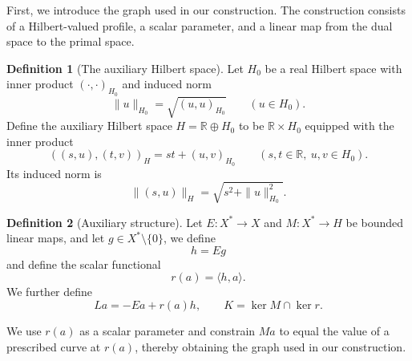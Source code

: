 \documentclass[11pt]{article}
\newcommand{\R}{\mathbb R}
\newcommand{\pair}[2]{\langle #1,#2\rangle}
\theoremstyle{definition}
\newtheorem{definition}{Definition}
\theoremstyle{remark}
\begin{document}
First, we introduce the graph used in our construction. The construction consists of a Hilbert-valued profile, a scalar parameter, and a linear map from the dual space to the primal space. 


\begin{definition}[The auxiliary Hilbert space]
\label{def:hilbert-spaces-norms}
Let $H_0$ be a real Hilbert space with inner product $(\cdot,\cdot)_{H_0}$ and induced norm
\[
\|u\|_{H_0}=\sqrt{(u,u)_{H_0}}\qquad(u\in H_0).
\]
Define the auxiliary Hilbert space $H=\R\oplus H_0$ to be $\R\times H_0$ equipped with the inner product
\[
((s,u),(t,v))_H=st+(u,v)_{H_0}
\qquad(s,t\in\R,\ u,v\in H_0).
\]
Its induced norm is
\[
\|(s,u)\|_H=\sqrt{s^2+\|u\|_{H_0}^2}.
\]
\end{definition}


\begin{definition}[Auxiliary structure]
\label{def:construction-maps}
Let $E:X^*\to X$ and $M:X^*\to H$ be bounded linear maps, and let
$g\in X^*\setminus\{0\}$, we define 
\[
h=Eg
\]
and define the scalar functional
\[
r(a)=\pair{h}{a}.
\]
We further define
\[
La=-Ea+r(a)h,
\qquad
K=\ker M\cap\ker r.
\]
\end{definition}



We use $r(a)$ as a scalar parameter and constrain $Ma$ to equal the value of a prescribed curve at $r(a)$, thereby obtaining the graph used in our construction. 
\end{document}

